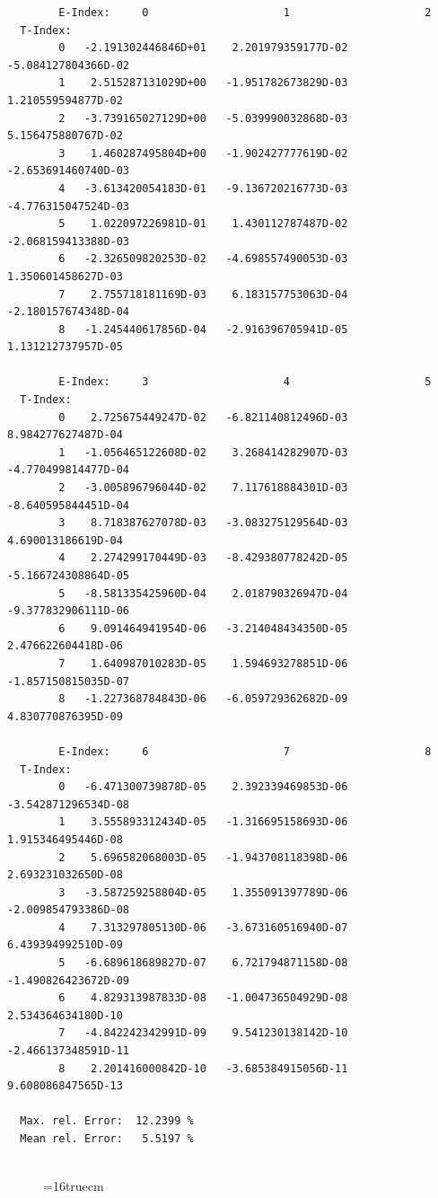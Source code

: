 \documentclass[12pt,dvips]{article}
\begin{document}
\begin{small}\begin{verbatim}
        E-Index:     0                     1                     2
  T-Index:
        0   -2.191302446846D+01    2.201979359177D-02   -5.084127804366D-02
        1    2.515287131029D+00   -1.951782673829D-03    1.210559594877D-02
        2   -3.739165027129D+00   -5.039990032868D-03    5.156475880767D-02
        3    1.460287495804D+00   -1.902427777619D-02   -2.653691460740D-03
        4   -3.613420054183D-01   -9.136720216773D-03   -4.776315047524D-03
        5    1.022097226981D-01    1.430112787487D-02   -2.068159413388D-03
        6   -2.326509820253D-02   -4.698557490053D-03    1.350601458627D-03
        7    2.755718181169D-03    6.183157753063D-04   -2.180157674348D-04
        8   -1.245440617856D-04   -2.916396705941D-05    1.131212737957D-05

        E-Index:     3                     4                     5
  T-Index:
        0    2.725675449247D-02   -6.821140812496D-03    8.984277627487D-04
        1   -1.056465122608D-02    3.268414282907D-03   -4.770499814477D-04
        2   -3.005896796044D-02    7.117618884301D-03   -8.640595844451D-04
        3    8.718387627078D-03   -3.083275129564D-03    4.690013186619D-04
        4    2.274299170449D-03   -8.429380778242D-05   -5.166724308864D-05
        5   -8.581335425960D-04    2.018790326947D-04   -9.377832906111D-06
        6    9.091464941954D-06   -3.214048434350D-05    2.476622604418D-06
        7    1.640987010283D-05    1.594693278851D-06   -1.857150815035D-07
        8   -1.227368784843D-06   -6.059729362682D-09    4.830770876395D-09

        E-Index:     6                     7                     8
  T-Index:
        0   -6.471300739878D-05    2.392339469853D-06   -3.542871296534D-08
        1    3.555893312434D-05   -1.316695158693D-06    1.915346495446D-08
        2    5.696582068003D-05   -1.943708118398D-06    2.693231032650D-08
        3   -3.587259258804D-05    1.355091397789D-06   -2.009854793386D-08
        4    7.313297805130D-06   -3.673160516940D-07    6.439394992510D-09
        5   -6.689618689827D-07    6.721794871158D-08   -1.490826423672D-09
        6    4.829313987833D-08   -1.004736504929D-08    2.534364634180D-10
        7   -4.842242342991D-09    9.541230138142D-10   -2.466137348591D-11
        8    2.201416000842D-10   -3.685384915056D-11    9.608086847565D-13

  Max. rel. Error:  12.2399 %
  Mean rel. Error:   5.5197 %


\end{verbatim}\end{small}
\begin{figure} \label{2.2.5mar}
\epsfxsize=16truecm
\end{figure}
\newpage
\end{document}
